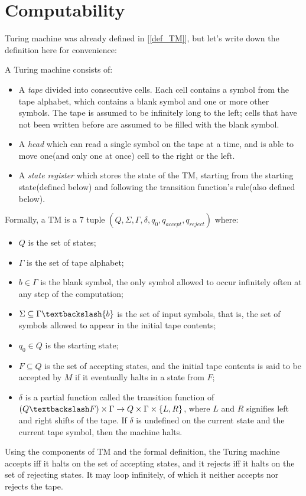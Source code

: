 

    \section{Computability}
    
    Turing machine was already defined in [\ref{def_TM}], but let's write down the definition here for convenience:
    
    \begin{defn}
		A Turing machine consists of:
		\begin{itemize}
			\item A \emph{tape} divided into consecutive cells. Each cell contains a symbol from the tape alphabet, which contains a blank symbol and one or more other symbols. The tape is assumed to be infinitely long to the left; cells that have not been written before are assumed to be filled with the blank symbol.
			\item A \emph{head} which can read a single symbol on the tape at a time, and is able to move one(and only one at once) cell to the right or the left.
				\item A \emph{state register} which stores the state of the TM, starting from the starting state(defined below) and following the transition function's rule(also defined below).
		\end{itemize}
		Formally, a TM is a 7 tuple $(Q,\Sigma,\Gamma,\delta,q_0,q_{accept},q_{reject})$ where:
		\begin{itemize}
			\item $Q$ is the set of states;
			\item $\Gamma$ is the set of tape alphabet;
			\item $b \in \Gamma$ is the blank symbol, the only symbol allowed to occur infinitely often at any step of the computation;
			\item $\Sigma \subseteq \Gamma \textbackslash \{b\}$ is the set of input symbols, that is, the set of symbols allowed to appear in the initial tape contents;
			\item $q_0 \in Q$ is the starting state;
			\item $F \subseteq Q$ is the set of accepting states, and the initial tape contents is said to be accepted by $M$ if it eventually halts in a state from $F$;
			\item $\delta$ is a partial function called the transition function of $(Q \textbackslash F) \times \Gamma \rightarrow Q \times \Gamma \times \{L,R\}$, where $L$ and $R$ signifies left and right shifts of the tape. If $\delta$ is undefined on the current state and the current tape symbol, then the machine halts.
			\end{itemize}
			Using the components of TM and the formal definition, the Turing machine accepts iff it halts on the set of accepting states, and it rejects iff it halts on the set of rejecting states. It may loop infinitely, of which it neither accepts nor rejects the tape.
		\end{defn}
	

